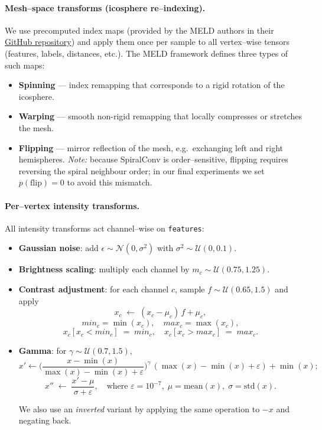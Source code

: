 \documentclass[FCD_GNN.tex]{subfiles}
\begin{document}
\paragraph{Mesh--space transforms (icosphere re–indexing).}
We use precomputed index maps (provided by the MELD authors in their \href{https://github.com/MELDProject/meld_graph/tree/main/data}{GitHub repository}) and apply them once per sample to all vertex–wise tensors (features, labels, distances, etc.). 
The MELD framework defines three types of such maps:
\begin{itemize}
  \item \textbf{Spinning} — index remapping that corresponds to a rigid rotation of the icosphere.
  \item \textbf{Warping} — smooth non-rigid remapping that locally compresses or stretches the mesh.
  \item \textbf{Flipping} — mirror reflection of the mesh, e.g.\ exchanging left and right hemispheres. \emph{Note:} because SpiralConv is order–sensitive, flipping requires reversing the spiral neighbour order; in our final experiments we set $p(\text{flip}){=}0$ to avoid this mismatch.
\end{itemize}

\paragraph{Per–vertex intensity transforms.}
All intensity transforms act channel–wise on \texttt{features}:
\begin{itemize}
\item \textbf{Gaussian noise}: add $\epsilon\sim\mathcal{N}(0,\sigma^2)$ with $\sigma^2 \sim \mathcal{U}(0,0.1)$.
\item \textbf{Brightness scaling}: multiply each channel by $m_c\sim\mathcal{U}(0.75,1.25)$.
\item \textbf{Contrast adjustment}: for each channel $c$, sample $f\sim\mathcal{U}(0.65,1.5)$ and apply
\[
x_c \;\leftarrow\; (x_c - \mu_c)\,f + \mu_c,
\]
\[min_c = \min(x_c), \quad
max_c = \max(x_c),
\]
\[
x_c[x_c < min_c] \;=\; min_c, \quad
x_c[x_c > max_c] \;=\; max_c.
\]
\item \textbf{Gamma}: for $\gamma\sim\mathcal{U}(0.7,1.5)$,
\[
x' \leftarrow \Big(\frac{x-\min(x)}{\max(x)-\min(x)+\varepsilon}\Big)^{\gamma}\,(\max(x)-\min(x)+\varepsilon)+\min(x);
\]
\[
x'' \;\leftarrow\; \frac{x' - \mu}{\sigma + \varepsilon},
\quad \text{where } \varepsilon = 10^{-7},\;
\mu = \mathrm{mean}(x),\;
\sigma = \mathrm{std}(x).
\]

We also use an \emph{inverted} variant by applying the same operation to $-x$ and negating back.
\end{itemize}
\end{document}

